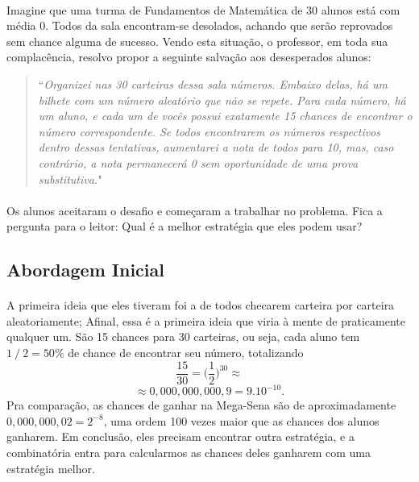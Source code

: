 \documentclass{article}
\begin{document}
        \paragraph{}Imagine que uma turma de Fundamentos de Matem\'atica de 30 alunos est\'a com m\'edia 0. Todos da sala encontram-se desolados, achando que ser\~ao
        reprovados sem chance alguma de sucesso. Vendo esta situa\c c\~ao, o professor, em toda sua complac\^encia, resolvo propor a seguinte salva\c c\~ao aos desesperados 
        alunos:
        \begin{quote}
            ``\textit{Organizei nas 30 carteiras dessa sala n\'umeros. Embaixo delas, h\'a um bilhete com um n\'umero aleat\'orio que n\~ao se repete. Para cada n\'umero, 
            h\'a um aluno, e cada um de voc\^es possui exatamente 15 chances de encontrar o n\'umero correspondente. Se todos encontrarem os n\'umeros respectivos dentro 
            dessas tentativas, aumentarei a nota de todos para 10, mas, caso contr\'ario, a nota permanecer\'a 0 sem oportunidade de uma prova substitutiva.}"
        \end{quote}
        \paragraph{}Os alunos aceitaram o desafio e come\c caram a trabalhar no problema. Fica a pergunta para o leitor: Qual \'e a melhor estrat\'egia que eles podem usar?
    \subsection{Abordagem Inicial}
        \paragraph{}A primeira ideia que eles tiveram foi a de todos checarem carteira por carteira aleatoriamente; Afinal, essa \'e a primeira ideia que viria \`a mente 
        de praticamente qualquer um. S\~ao 15 chances para 30 carteiras, ou seja, cada aluno tem $1 \fracslash 2 = 50\%$ de chance de encontrar seu n\'umero, totalizando  
        $$
            \frac{15}{30} = \biggl(\frac{1}{2}\biggr)^{30} \approx 
        $$
        $$
            \approx 0,000,000,000,9 = 9.10^{-10}.
        $$
        Pra compara\c c\~ao, as chances de ganhar na Mega-Sena s\~ao de aproximadamente $0,000,000,02 = 2^{-8}$, uma ordem 100 vezes maior que as chances dos alunos ganharem.
        Em conclus\~ao, eles precisam encontrar outra estrat\'egia, e a combinat\'oria entra para calcularmos as chances deles ganharem com uma estrat\'egia melhor.
\end{document}
